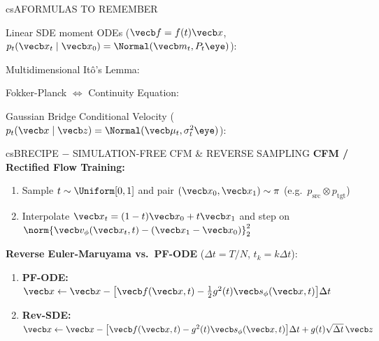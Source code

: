 \documentclass[../../../../master.tex]{subfiles}
\begin{document}
\csnextpage

\begin{cscolumns}
\begin{cscard}{csA}{FORMULAS TO REMEMBER}
  \begin{csbul}
    \item Linear SDE moment ODEs ($\vecb f=f(t)\vecb x$, $p_t(\vecb x_t\mid\vecb x_0)=\Normal(\vecb m_t,P_t\eye)$):
    \item Multidimensional It\^o's Lemma:
    \item Fokker-Planck $\Longleftrightarrow$ Continuity Equation:
    \item Gaussian Bridge Conditional Velocity ($p_t(\vecb x\mid\vecb z)=\Normal(\vecb\mu_t,\sigma_t^2\eye)$):
  \end{csbul}
\end{cscard}

\begin{cscard}{csB}{RECIPE $-$ SIMULATION-FREE CFM \& REVERSE SAMPLING}
  \textbf{CFM / Rectified Flow Training:}
  \begin{enumerate}[leftmargin=1.2em, itemsep=1pt, topsep=1pt, parsep=0pt]
    \item Sample $t\sim\Uniform[0,1]$ and pair $(\vecb x_0,\vecb x_1)\sim\pi$ (e.g.\ $p_{\mathrm{src}}\otimes p_{\mathrm{tgt}}$)
    \item Interpolate $\vecb x_t=(1-t)\vecb x_0+t\vecb x_1$ and step on $\norm{\vecb v_\phi(\vecb x_t,t)-(\vecb x_1-\vecb x_0)}_2^2$
  \end{enumerate}
  \vspace{2pt}
  \textbf{Reverse Euler-Maruyama vs.\ PF-ODE} ($\Delta t=T/N$, $t_k=k\Delta t$):
  \begin{enumerate}[leftmargin=1.2em, itemsep=1pt, topsep=1pt, parsep=0pt]
    \item \textbf{PF-ODE:} $\vecb x\gets\vecb x-\bigl[\vecb f(\vecb x,t)-\frac{1}{2}g^2(t)\vecb s_\phi(\vecb x,t)\bigr]\Delta t$
    \item \textbf{Rev-SDE:} $\vecb x\gets\vecb x-\bigl[\vecb f(\vecb x,t)-g^2(t)\vecb s_\phi(\vecb x,t)\bigr]\Delta t+g(t)\sqrt{\Delta t}\,\vecb z$
  \end{enumerate}
\end{cscard}
\columnbreak


\end{cscolumns}
\end{document}
